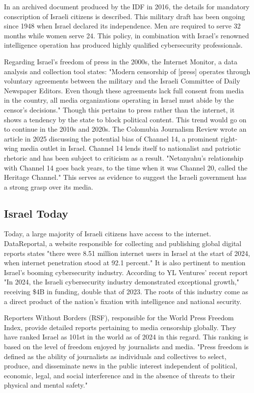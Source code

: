 In an archived document produced by the IDF in 2016, the details for mandatory conscription of Israeli citizens is described. \cite{MOIA2016IDF} This military draft has been ongoing since 1948 when Israel declared its independence. Men are required to serve 32 months while women serve 24. This policy, in combination with Israel's renowned intelligence operation has produced highly qualified cybersecurity professionals. 

Regarding Israel's freedom of press in the 2000s, the Internet Monitor, a data analysis and collection tool states: "Modern censorship of [press] operates through voluntary agreements between the military and the Israeli Committee of Daily Newspaper Editors. Even though these agreements lack full consent from media in the country, all media organizations operating in Israel must abide by the censor's decisions." \cite{internet_monitor_israel} Though this pertains to press rather than the internet, it shows a tendency by the state to block political content. This trend would go on to continue in the 2010s and 2020s. The Colomubia Journalism Review wrote an article in 2025 discussing the potential bias of Channel 14, a prominent right-wing media outlet in Israel. Channel 14 lends itself to nationalist and patriotic rhetoric and has been subject to criticism as a result. "Netanyahu’s relationship with Channel 14 goes back years, to the time when it was Channel 20, called the Heritage Channel." \cite{CJR2024IsraelChannel14} This serves as evidence to suggest the Israeli government has a strong grasp over its media. 

\subsection{Israel Today}
Today, a large majority of Israeli citizens have access to the internet. DataReportal, a website responsible for collecting and publishing global digital reports states "there were 8.51 million internet users in Israel at the start of 2024, when internet penetration stood at 92.1 percent." \cite{Digital2024Israel} It is also pertinent to mention Israel's booming cybersecurity industry. According to YL Ventures' recent report "In 2024, the Israeli cybersecurity industry demonstrated exceptional growth," receiving \$4B in funding, double that of 2023. The roots of this industry come as a direct product of the nation's fixation with intelligence and national security. 


Reporters Without Borders (RSF), responsible for the World Press Freedom Index, provide detailed reports pertaining to media censorship globally. They have ranked Israel as 101st in the world as of 2024 in this regard. This ranking is based on the level of freedom enjoyed by journalists and media. "Press freedom is defined as the ability of journalists as individuals and collectives to select, produce, and disseminate news in the public interest independent of political, economic, legal, and social interference and in the absence of threats to their physical and mental safety." \cite{rsf_israel} 


